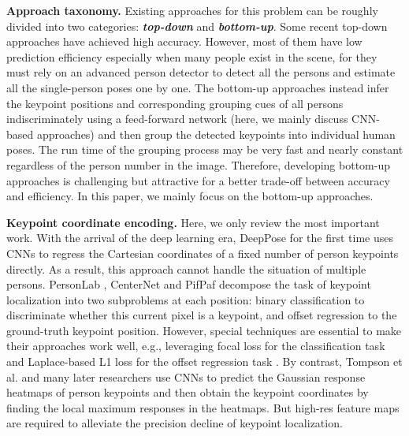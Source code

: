 \documentclass{article}
\begin{document}
\textbf{Approach taxonomy.} Existing approaches for this problem can be roughly divided into two categories: \textbf{\textit{top-down}} and \textbf{\textit{bottom-up}}. Some recent top-down approaches \cite{zhang2020distribution, Chen2017Cascaded, Papandreou2017Towards, sun2019deep, He2017Mask} have achieved high accuracy. However, most of them have low prediction efficiency especially when many people exist in the scene, for they must rely on an advanced person detector to detect all the persons and estimate all the single-person poses one by one. The bottom-up approaches  \cite{Cao2017Realtime, Newell2017Associative, kreiss2019pifpaf, li2020simple, cheng2019higherhrnet} instead infer the keypoint positions and corresponding grouping cues of all persons indiscriminately using a feed-forward network (here, we mainly discuss CNN-based approaches) and then group the detected keypoints into individual human poses. The run time of the grouping process may be very fast and nearly constant regardless of the person number in the image.
Therefore, developing bottom-up approaches is challenging but attractive for a better trade-off between accuracy and efficiency. In this paper, we mainly focus on the bottom-up approaches.

\textbf{Keypoint coordinate encoding.} Here, we only review the most important work. With the arrival of the deep learning era, DeepPose \cite{Toshev2013DeepPose} for the first time uses  CNNs to regress the Cartesian coordinates of a fixed number of person keypoints directly. As a result, this approach cannot handle the situation of multiple persons.  PersonLab  \cite{Papandreou2018PersonLab}, CenterNet \cite{Zhou:2019ta} and PifPaf \cite{kreiss2019pifpaf} decompose the task of keypoint localization into two subproblems at each position: binary classification to discriminate whether this current pixel is a keypoint, and offset regression to the ground-truth keypoint position. However, special techniques are essential to make their approaches work well, e.g., leveraging focal loss \cite{Lin2017Focal} for the classification task and Laplace-based L1 loss \cite{kendall2017uncertainties} for the offset regression task \cite{kreiss2019pifpaf}. By contrast, Tompson  et al. \cite{Tompson2014Joint} and many later researchers use CNNs to predict the Gaussian response heatmaps of person keypoints and then obtain the keypoint coordinates by finding the local maximum responses in the heatmaps. But high-res feature maps are required to alleviate the precision decline of keypoint localization.
\end{document}
